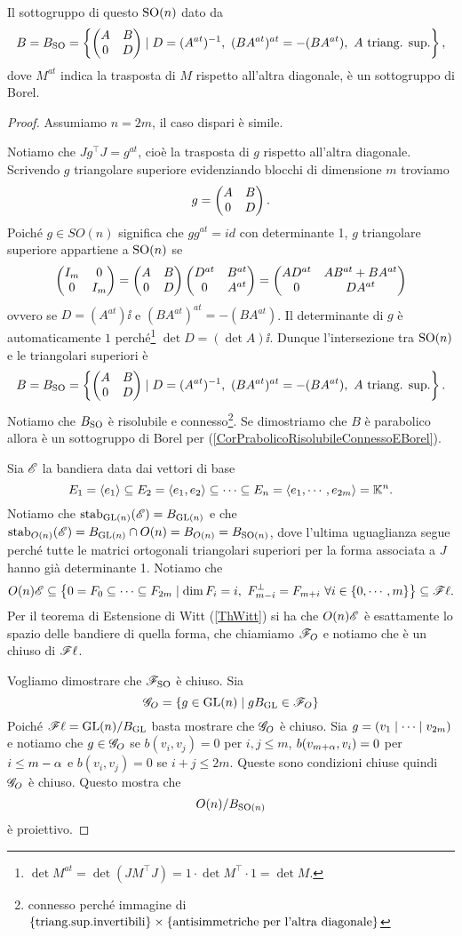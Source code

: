\begin{proposition}
Il sottogruppo di questo $\operatorname{SO}(n)$ dato da
\[B=B_{\operatorname{SO}}=\left\{{\begin{pmatrix}A&B\\0&D\end{pmatrix}\mid D=(A^{at})^{-1},\ (BA^{at})^{at}=-(BA^{at}),\ A\text{ triang. sup.}}\right\},\]
dove $M^{at}$ indica la trasposta di $M$ rispetto all'altra diagonale, \`e un sottogruppo di Borel.
\end{proposition}
\begin{proof}
Assumiamo $n=2m$, il caso dispari \`e simile.

Notiamo che $Jg^\top J=g^{at}$, cio\`e la trasposta di $g$ rispetto all'altra diagonale. Scrivendo $g$ triangolare superiore evidenziando blocchi di dimensione $m$ troviamo
\[g=\begin{pmatrix}A&B\\0&D\end{pmatrix}.\]
Poich\'e $g\in SO(n)$ significa che $gg^{at}=id$ con determinante 1, $g$ triangolare superiore appartiene a $\operatorname{SO}(n)$ se
\[\begin{pmatrix}I_m &0\\0&I_m\end{pmatrix}=\begin{pmatrix}A&B\\0&D\end{pmatrix}\begin{pmatrix}D^{at}&B^{at}\\0&A^{at}\end{pmatrix}=\begin{pmatrix}AD^{at}&AB^{at}+BA^{at}\\0&DA^{at}\end{pmatrix}\]
ovvero se $D=(A^{at})\ii$ e $(BA^{at})^{at}=-(BA^{at})$. Il determinante di $g$ \`e automaticamente $1$ perch\'e\footnote{$\det M^{at}=\det(JM^\top J)=1\cdot \det M^\top\cdot 1=\det M$.} $\det D=(\det A)\ii$.
Dunque l'intersezione tra $\operatorname{SO}(n)$ e le triangolari superiori \`e
\[B=B_{\operatorname{SO}}=\left\{{\begin{pmatrix}A&B\\0&D\end{pmatrix}\mid D=(A^{at})^{-1},\ (BA^{at})^{at}=-(BA^{at}),\ A\text{ triang. sup.}}\right\}.\]
Notiamo che $B_{\operatorname{SO}}$ \`e risolubile e connesso\footnote{connesso perch\'e immagine di $\left\{{\text{triang.sup.invertibili}}\right\}\times \left\{{\text{antisimmetriche per l'altra diagonale}}\right\}$}. Se dimostriamo che $B$ \`e parabolico allora \`e un sottogruppo di Borel per (\ref{CorPrabolicoRisolubileConnessoEBorel}). 



Sia $\mathscr{E}$ la bandiera data dai vettori di base 
\[E_1=\left\langle {e_1}\right\rangle\subseteq E_2=\left\langle {e_1,e_2}\right\rangle\subseteq\cdots\subseteq E_n=\left\langle {e_1,\cdots, e_{2m}}\right\rangle=\mathbb{K}^n.\] 
Notiamo che $\operatorname{stab}_{\mathrm{GL}(n)}(\mathscr{E})=B_{\mathrm{GL}(n)}$ e che $\operatorname{stab}_{O(n)}(\mathscr{E})=B_{\mathrm{GL}(n)}\cap O(n)=B_{O(n)}=B_{\operatorname{SO}(n)}$, dove l'ultima uguaglianza segue perch\'e tutte le matrici ortogonali triangolari superiori per la forma associata a $J$ hanno gi\`a determinante 1.
Notiamo che 
\[O(n)\Es\subseteq \cpa{0=F_0\subseteq\cdots\subseteq F_{2m}\mid \dim F_i=i,\ F_{m-i}^\perp=F_{m+i}\ \forall i\in\cpa{0,\cdots,m}}\subseteq \Fs\ell.\]
Per il teorema di Estensione di Witt (\ref{ThWitt}) si ha che $O(n)\mathscr{E}$ \`e esattamente lo spazio delle bandiere di quella forma, che chiamiamo $\mathscr{F}_O$ e notiamo che \`e un chiuso di $\mathscr{F}\ell$.

Vogliamo dimostrare che $\mathscr{F}_{\operatorname{SO}}$ \`e chiuso. Sia
\[\mathscr{G}_O=\left\{{g\in \mathrm{GL}(n)\mid gB_{\mathrm{GL}}\in \mathscr{F}_O}\right\}\]
Poich\'e $\mathscr{F}\ell=\mathrm{GL}(n)/B_{\mathrm{GL}}$ basta mostrare che $\mathscr{G}_O$ \`e chiuso. Sia $g=\left({v_1\mid\cdots\mid v_{2m}}\right)$ e notiamo che $g\in\mathscr{G}_O$ se $b(v_i,v_j)=0$ per $i,j\leq m$, $b(v_{m+\alpha},v_i)=0$ per $i\leq m-\alpha$ e $b(v_i,v_j)=0$ se $i+j\leq 2m$. Queste sono condizioni chiuse quindi $\mathscr{G}_O$ \`e chiuso. Questo mostra che
\[O(n)/B_{\operatorname{SO}(n)}\]
\`e proiettivo.
\end{proof}
